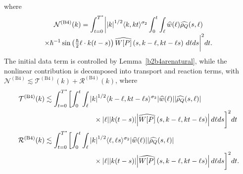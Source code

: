 \documentclass[JEP,XML,SOM,Unicode]{cedram}
\theoremstyle{plain}
\theoremstyle{remark}
\newcommand{\br}[1]{\left(#1\right)}
\newcommand{\ak}{\abs{k}}
\newcommand{\jb}[1]{\langle#1\rangle}
\newcommand{\mytextfrac}[2]{{\textstyle\frac{#1}{#2}}}
\begin{document}
\pagebreak[2]\noindent
where\vspace*{-5pt}
\begin{multline*}
\mathcal{N}^{\mathrm{(B4)}}(k)=\int_{t=0}^{T^*}\biggl|\ak^{1/2}\jb{k,kt}^{\sigma_2}\int_0^t\int_\ell\widehat w(\ell)\widehat{\rho_Q}(s,\ell) \\[-3pt]
\times\hbar^{-1}\sin\br{\mytextfrac{\hbar}{2}\ell\cdot k(t-s)}\widehat {W[P]}\br{s,k-\ell,kt-\ell s}\,d\ell ds\biggr|^2dt.
\end{multline*}
The initial data term is controlled by Lemma~\ref{b2b4arenatural}, while the nonlinear contribution is decomposed into transport and reaction terms, with $\mathcal{N}^{\mathrm{(B4)}}\lesssim \mathcal{T}^{\mathrm{(B4)}}(k)+\mathcal{R}^{\mathrm{(B4)}}(k)$, where\vspace*{-3pt}
\begin{align*}
\mathcal{T}^{\mathrm{(B4)}}(k)&\lesssim\int_{t=0}^{T^*}\biggl[\int_0^t\int_\ell\ak^{1/2}\jb{k-\ell,kt-\ell s}^{\sigma_2}\abs{\widehat w(\ell)}\abs{\widehat{\rho_Q}(s,\ell)} \\
&\hspace{2.5cm}\times\abs{\ell}\abs{k(t-s)}\abs{\widehat {W[P]}\br{s,k-\ell,kt-\ell s}}\,d\ell ds\biggr]^2dt\\
\mathcal{R}^{\mathrm{(B4)}}(k)&\lesssim\int_{t=0}^{T^*}\biggl[\int_0^t\int_\ell\ak^{1/2}\jb{\ell,\ell s}^{\sigma_2}\abs{\widehat w(\ell)}\abs{\widehat{\rho_Q}(s,\ell)} \\
&\hspace{2.5cm}\times\abs{\ell}\abs{k(t-s)}\abs{\widehat {W[P]}\br{s,k-\ell,kt-\ell s}}\,d\ell ds\biggr]^2dt.
\end{align*}
\end{document}
